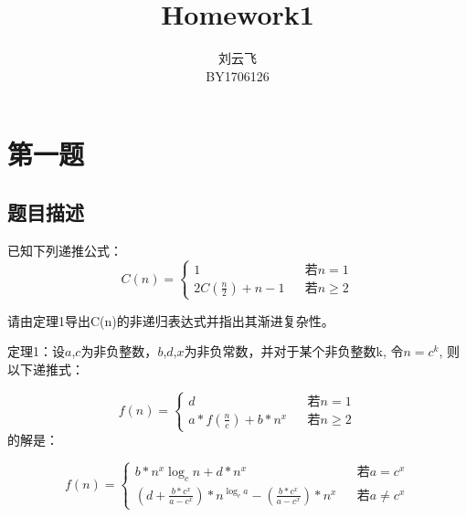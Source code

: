 \documentclass[cs4size, punct, nospace, fancyhdr, fntef, UTF8]{ctexart}
\author{刘云飞\\BY1706126}
\title{Homework1}
\date{}
\begin{document}
\maketitle

  \section{第一题}
  \subsection{题目描述}
  已知下列递推公式：
  \begin{equation}\label{equ:1_1}
    C(n)=\left\{
    \begin{array}{lcl}
      1                                          &      & {若n=1}\\
      {2C\left(\frac{n}{2} \right) + n - 1}      &      & {若n\ge 2}
  \end{array} \right.
  \end{equation}

  请由定理1导出C(n)的非递归表达式并指出其渐进复杂性。

  {\heiti 定理1：}设$a$,$c$为非负整数，$b$,$d$,$x$为非负常数，并对于某个非负整数k, 令$n=c^k$, 则以下递推式：

  \begin{equation}\label{equ:1_2}
      f(n)=\left\{
      \begin{array}{lcl}
        d                                         &      & {若n=1}\\
        {a*f\left(\frac{n}{c}\right) + b*n^x}     &      & {若n\ge 2}
      \end{array} \right.
  \end{equation}
  的解是：

  \begin{equation}\label{equ_1_3}
    f(n)=\left\{
      \begin{array}{lcl}
        {b*n^x\log_c{n} + d*n^x}                    &      & {若a = c^x}\\
        {\left( d + \frac{b*c^x}{a - c^x}\right) * n^{\log_c{a}} - \left( \frac{b*c^x}{a - c^x} \right) * n^x}     &      & {若a\ne c^x}
      \end{array} \right.
  \end{equation}
\end{document}
